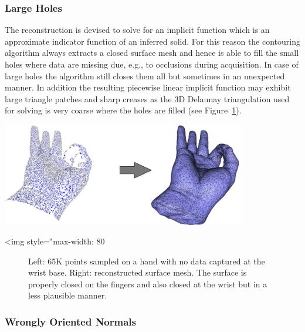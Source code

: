 \subsubsection{Large Holes}

The reconstruction is devised to solve for an implicit function which is an approximate indicator function of an inferred solid. For this reason the contouring algorithm always extracts a closed surface mesh and hence is able to fill the small holes where data are missing due, e.g., to occlusions during acquisition. In case of large holes the algorithm still closes them all but sometimes in an unexpected manner. In addition the resulting piecewise linear implicit function may exhibit large triangle patches and sharp creases as the 3D Delaunay triangulation used for solving is very coarse where the holes are filled (see Figure~\ref{Surface_reconstruction_points_3-fig-holes_bad}).

\begin{center}
    \begin{ccTexOnly}
        \includegraphics[width=0.8\textwidth]{Surface_reconstruction_points_3/holes_bad}
    \end{ccTexOnly}
    \begin{ccHtmlOnly}
        <img style="max-width: 80%
    \end{ccHtmlOnly}
    \begin{figure}[h]
        \caption{Left: 65K points sampled on a hand with no data
                 captured at the wrist base.
                 Right: reconstructed surface mesh. The surface is
                 properly closed on the fingers and also closed
                 at the wrist but in a less plausible manner.}
        \label{Surface_reconstruction_points_3-fig-holes_bad}
    \end{figure}
\end{center}


\subsubsection{Wrongly Oriented Normals}

